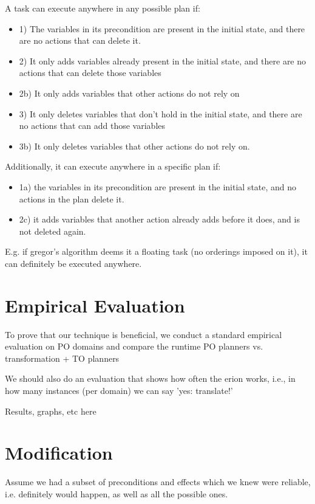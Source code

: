 A task can execute anywhere in any possible plan if: 
\begin{itemize}
\item 1) The variables in its precondition are present in the initial state, and there are no actions that can delete it.
\item 2) It only adds variables already present in the initial state, and there are no actions that can delete those variables
\item 2b) It only adds variables that other actions do not rely on
\item 3) It only deletes variables that don't hold in the initial state, and there are no actions that can add those variables
\item 3b) It only deletes variables that other actions do not rely on.
\end{itemize}


Additionally, it can execute anywhere in a specific plan if:
\begin{itemize}
\item 1a) the variables in its precondition are present in the initial state, and no actions in the plan delete it.
\item 2c) it adds variables that another action already adds before it does, and is not deleted again.
\end{itemize} 

E.g. if gregor's algorithm deems it a floating task (no orderings imposed on it),
it can definitely be executed anywhere.


\section{Empirical Evaluation}

To prove that our technique is beneficial, we conduct a standard empirical evaluation on PO domains and compare the runtime PO planners vs. transformation + TO planners

We should also do an evaluation that shows how often the erion works, i.e., in how many instances (per domain) we can say 'yes: translate!'

Results, graphs, etc here


\section{Modification}
Assume we had a subset of preconditions and effects which we knew were reliable, i.e. definitely would happen,
as well as all the possible ones.

